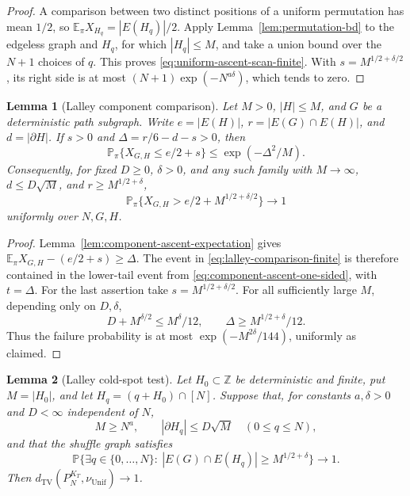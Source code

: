 \documentclass[11pt]{article}
\numberwithin{equation}{section}
\newtheorem{lemma}[lemma]{Lemma}
\newcommand{\TV}{\mathrm{TV}}
\newcommand{\Unif}{\mathrm{Unif}}
\newcommand{\E}{\mathbb E}
\newcommand{\Pp}{\mathbb P}
\newcommand{\1}{\mathbf 1}
\newcommand{\nuUnif}{\nu_{\Unif}}
\begin{document}
\begin{proof}
A comparison between two distinct positions of a uniform permutation
has mean \(1/2\), so \(\E_\pi X_{H_q}=|E(H_q)|/2\).
Apply Lemma~\ref{lem:permutation-bd} to the edgeless graph and
\(H_q\), for which \(|H_q|\le M\), and take a union bound over
the \(N+1\) choices of \(q\).  This proves
\eqref{eq:uniform-ascent-scan-finite}.  With
\(s=M^{1/2+\delta/2}\), its right side is at most
\((N+1)\exp(-N^{a\delta})\), which tends to zero.
\end{proof}

\begin{lemma}[Lalley component comparison]
\label{lem:lalley-comparison}
Let \(M>0\), \(|H|\le M\), and \(G\) be a deterministic
path subgraph.  Write \(e=|E(H)|\),
\(r=|E(G)\cap E(H)|\), and \(d=|\partial H|\).
If \(s>0\) and \(\Delta=r/6-d-s>0\), then
\begin{equation}
\label{eq:lalley-comparison-finite}
  \Pp_\pi\{X_{G,H}\le e/2+s\}
  \le\exp(-\Delta^2/M).
\end{equation}
Consequently, for fixed \(D\ge0\), \(\delta>0\), and any such
family with \(M\to\infty\), \(d\le D\sqrt M\), and
\(r\ge M^{1/2+\delta}\),
\[
  \Pp_\pi\{X_{G,H}>e/2+M^{1/2+\delta/2}\}\longrightarrow1
\]
uniformly over \(N,G,H\).
\end{lemma}

\begin{proof}
Lemma~\ref{lem:component-ascent-expectation} gives
\(\E_\pi X_{G,H}-(e/2+s)\ge\Delta\).
The event in \eqref{eq:lalley-comparison-finite} is therefore
contained in the lower-tail event from
\eqref{eq:component-ascent-one-sided}, with \(t=\Delta\).
For the last assertion take \(s=M^{1/2+\delta/2}\).
For all sufficiently large \(M\), depending only on \(D,\delta\),
\[
  D+M^{\delta/2}\le M^\delta/12,
  \qquad
  \Delta\ge M^{1/2+\delta}/12.
\]
Thus the failure probability is at most
\(\exp(-M^{2\delta}/144)\), uniformly as claimed.
\end{proof}

\begin{lemma}[Lalley cold-spot test]
\label{lem:lalley}
Let \(H_0\subset\mathbb Z\) be deterministic and finite, put
\(M=|H_0|\), and let \(H_q=(q+H_0)\cap[N]\).
Suppose that, for constants \(a,\delta>0\) and \(D<\infty\)
independent of \(N\),
\[
  M\ge N^a,\qquad |\partial H_q|\le D\sqrt M
  \quad(0\le q\le N),
\]
and that the shuffle graph satisfies
\[
  \Pp\{\exists q\in\{0,\ldots,N\}:\
         |E(G)\cap E(H_q)|\ge M^{1/2+\delta}\}\longrightarrow1.
\]
Then \(d_{\TV}(P_N^{K_T},\nuUnif)\longrightarrow1\).
\end{lemma}
\end{document}

